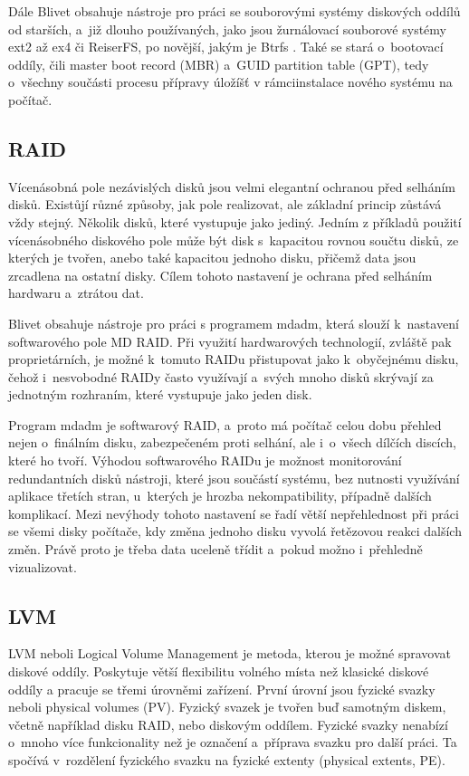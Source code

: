 \documentclass[color,table,oneside,nolot,nolof]{fithesis}
\begin{document}
	Dále Blivet obsahuje nástroje pro práci se souborovými systémy diskových oddílů od starších, a~již dlouho používaných, jako jsou žurnálovací souborové systémy ext2 až ex4 či ReiserFS, po novější,
	jakým je Btrfs . Také se stará o~bootovací oddíly, čili master boot record (MBR) a~GUID partition table (GPT), tedy o~všechny součásti procesu přípravy 
	úložíšť v rámciinstalace
	nového systému na počítač.

\subsection{RAID}
	Vícenásobná pole nezávislých disků jsou velmi elegantní ochranou před selháním disků. Existůjí různé způsoby, jak pole realizovat, ale základní princip zůstává vždy stejný. 
	Několik disků, které vystupuje jako jediný. Jedním z příkladů použití vícenásobného diskového pole může být disk s~kapacitou rovnou součtu disků, ze kterých je tvořen, anebo také
	kapacitou jednoho disku, přičemž data jsou zrcadlena na ostatní disky. Cílem tohoto nastavení je ochrana před selháním hardwaru a~ztrátou dat. 
	
	Blivet obsahuje nástroje pro práci s programem mdadm, která slouží k~nastavení softwarového pole MD RAID. Při využití hardwarových technologií, zvláště pak proprietárních,
	je možné k~tomuto RAIDu přistupovat jako k~obyčejnému disku, čehož i~nesvobodné RAIDy často využívají a~svých mnoho disků skrývají za jednotným rozhraním, které vystupuje jako jeden
	disk. 

	Program mdadm je softwarový RAID, a~proto má počítač celou dobu přehled nejen o~finálním disku, zabezpečeném proti selhání, ale i~o~všech dílčích discích, které ho tvoří. Výhodou
	softwarového RAIDu je
	možnost monitorování redundantních disků nástroji, které jsou součástí systému, bez nutnosti využívání aplikace třetích stran, u~kterých je hrozba nekompatibility, případně dalších 
	komplikací.
	Mezi nevýhody tohoto nastavení se řadí větší nepřehlednost při práci se všemi disky počítače, kdy změna jednoho disku vyvolá řetězovou reakci dalších změn. Právě proto je třeba data uceleně třídit
	a~pokud možno i~přehledně vizualizovat.

\subsection{LVM}
  LVM neboli Logical Volume Management je metoda, kterou je možné spravovat diskové oddíly. Poskytuje větší flexibilitu volného místa než klasické diskové oddíly a pracuje se třemi
	úrovněmi
	zařízení. První úrovní jsou fyzické svazky neboli physical volumes (PV). Fyzický svazek je tvořen buď samotným diskem, včetně například disku RAID, nebo diskovým oddílem. 
	Fyzické
	svazky nenabízí o~mnoho více funkcionality než je označení a~příprava svazku pro další práci. Ta spočívá v~rozdělení fyzického svazku na fyzické extenty (physical extents, PE).
\end{document}
